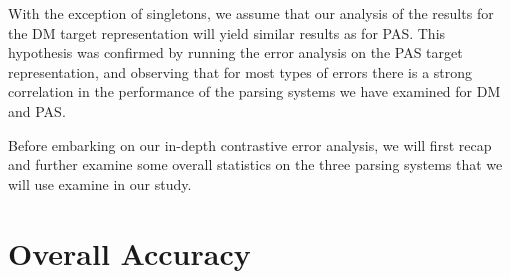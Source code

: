 With the exception of singletons, we assume that our analysis of the results for the DM target representation will yield similar results as for PAS. This hypothesis was confirmed by running the error analysis on the PAS target representation, and observing that for most types of errors there is a strong correlation in the performance of the parsing systems we have examined for DM and PAS.

Before embarking on our in-depth contrastive error analysis, we will first recap and further examine some overall statistics on the three parsing systems that we will use examine in our study.

\section{Overall Accuracy}

